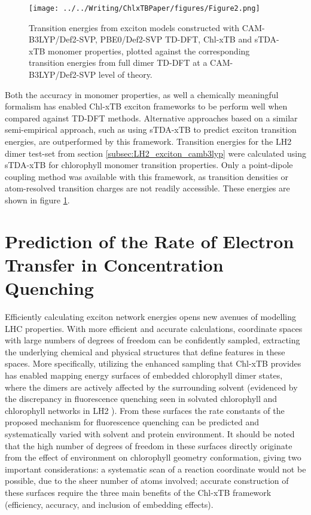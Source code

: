 \begin{figure}
    \centering
    \texttt{[image: ../../Writing/ChlxTBPaper/figures/Figure2.png]}
    \caption{Transition energies from exciton models constructed with CAM-B3LYP/Def2-SVP,
    PBE0/Def2-SVP TD-DFT, Chl-xTB and sTDA-xTB monomer properties, plotted against 
    the corresponding transition energies from full dimer TD-DFT at a CAM-B3LYP/Def2-SVP 
    level of theory.}
    \label{fig:dimer_w_stda}
\end{figure}

Both the accuracy in monomer properties, as well a chemically meaningful formalism
has enabled Chl-xTB exciton frameworks to be perform well when compared against
TD-DFT methods. Alternative approaches based on a similar semi-empirical approach,
such as using sTDA-xTB to predict exciton transition energies, are outperformed 
by this framework. Transition energies for the LH2 dimer test-set from section \ref{subsec:LH2_exciton_camb3lyp}
were calculated using sTDA-xTB for chlorophyll monomer transition properties. Only
a point-dipole coupling method was available with this framework, as transition 
densities or atom-resolved transition charges are not readily accessible. These
energies are shown in figure \ref{fig:dimer_w_stda}.

\section{Prediction of the Rate of Electron Transfer in Concentration Quenching}
\label{sec:concentration_quenching}
 
Efficiently calculating exciton network energies opens new avenues of modelling 
LHC properties. With more efficient and accurate calculations, coordinate spaces 
with large numbers of degrees of freedom can be confidently sampled, extracting 
the underlying chemical and physical structures that define features in these spaces.
More specifically, utilizing the enhanced sampling that Chl-xTB provides has enabled
mapping energy surfaces of embedded chlorophyll dimer states, where the dimers are
actively affected by the surrounding solvent (evidenced by the discrepancy in fluorescence 
quenching seen in solvated chlorophyll and chlorophyll networks in LH2 \cite{Watson1950}). 
From these surfaces the rate constants of the proposed mechanism for fluorescence 
quenching can be predicted and systematically varied with solvent and protein environment. 
It should be noted that the high number of degrees of freedom in these surfaces 
directly originate from the effect of environment on chlorophyll geometry conformation,
giving two important considerations: a systematic scan of a reaction coordinate 
would not be possible, due to the sheer number of atoms involved; accurate construction
of these surfaces require the three main benefits of the Chl-xTB framework 
(efficiency, accuracy, and inclusion of embedding effects).

